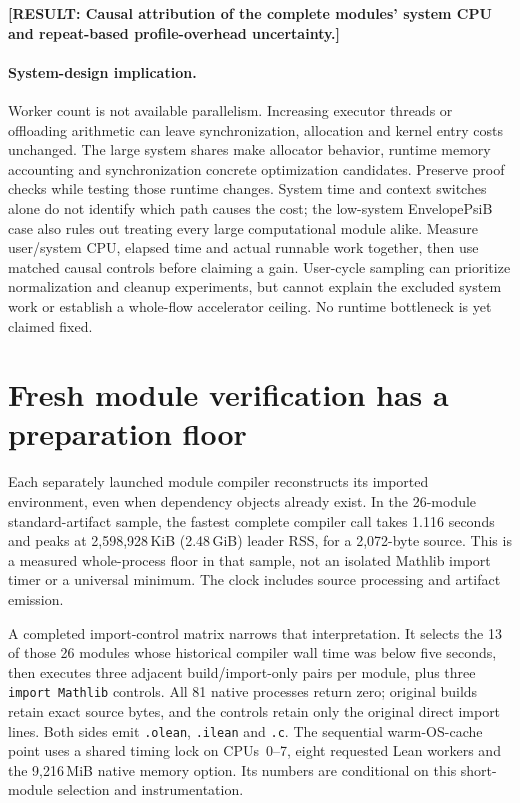 \documentclass[10pt,twocolumn]{article}
\newcommand{\missing}[1]{\textbf{[RESULT: #1]}}
\begin{document}
\missing{Causal attribution of the complete modules' system CPU and
repeat-based profile-overhead uncertainty.}

\paragraph{System-design implication.}
Worker count is not available parallelism. Increasing executor threads or
offloading arithmetic can leave synchronization, allocation and kernel
entry costs unchanged. The large system shares make allocator behavior,
runtime memory accounting and synchronization concrete optimization
candidates. Preserve proof checks while testing those runtime changes.
System time and context switches alone do not identify which path causes
the cost; the low-system EnvelopePsiB case also rules out treating every
large computational module alike.
Measure user/system CPU, elapsed time and actual runnable work together,
then use matched causal controls before claiming a gain.
User-cycle sampling can prioritize normalization and cleanup experiments,
but cannot explain the excluded system work or establish a whole-flow
accelerator ceiling. No runtime bottleneck is yet claimed fixed.

\section{Fresh module verification has a preparation floor}
\label{sec:imports}
Each separately launched module compiler reconstructs its imported
environment, even when dependency objects already exist.
In the 26-module standard-artifact sample, the fastest complete compiler
call takes 1.116 seconds and peaks at 2,598,928\,KiB
(2.48\,GiB) leader RSS, for a 2,072-byte source.
This is a measured whole-process floor in that sample, not an isolated
Mathlib import timer or a universal minimum.
The clock includes source processing and artifact emission.

A completed import-control matrix narrows that interpretation.
It selects the 13 of those 26 modules whose historical compiler wall time
was below five seconds, then executes three adjacent build/import-only
pairs per module, plus three \texttt{import Mathlib} controls.
All 81 native processes return zero; original builds retain exact source
bytes, and the controls retain only the original direct import lines.
Both sides emit \texttt{.olean}, \texttt{.ilean} and \texttt{.c}.
The sequential warm-OS-cache point uses a shared timing lock on CPUs~0--7,
eight requested Lean workers and the 9,216\,MiB native memory option.
Its numbers are conditional on this short-module selection and instrumentation.
\end{document}
